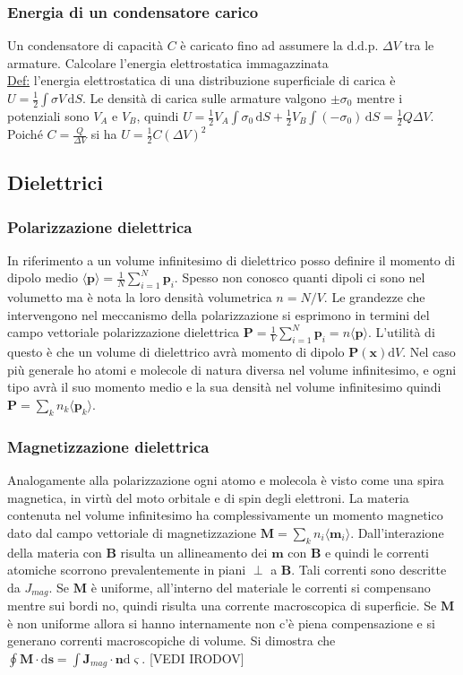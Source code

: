 \documentclass[11pt,a4paper]{article}
\newcommand{\de}{\mathrm d}
\begin{document}
\subsubsection{Energia di un condensatore carico}
Un condensatore di capacità $C$ è caricato fino ad assumere la d.d.p. $\Delta V$ tra le armature. Calcolare l'energia elettrostatica immagazzinata\\
\underline{Def:} l'energia elettrostatica di una distribuzione superficiale di carica è $U=\frac 12\int\sigma V\,\mathrm dS$. Le densità di carica sulle armature valgono $\pm\sigma_0$ mentre i potenziali sono $V_A$ e $V_B$, quindi $U=\frac 12 V_A\int\sigma_0\,\mathrm dS+\frac 12 V_B\int(-\sigma_0)\,\mathrm dS=\frac 12 Q\Delta V$. Poiché $C=\frac{Q}{\Delta V}$ si ha $U=\frac 12 C(\Delta V)^2$

\subsection{Dielettrici}
\subsubsection{Polarizzazione dielettrica}
In riferimento a un volume infinitesimo di dielettrico posso definire il momento di dipolo medio $\langle \mathbf p \rangle = \frac1N \sum_{i=1}^N \mathbf p_i$. Spesso non conosco quanti dipoli ci sono nel volumetto ma è nota la loro densità volumetrica $n = N/V$. Le grandezze che intervengono nel meccanismo della polarizzazione si esprimono in termini del campo vettoriale polarizzazione dielettrica $\mathbf P = \frac1V \sum_{i=1}^N \mathbf p_i = n \langle \mathbf p \rangle$. L'utilità di questo è che un volume di dielettrico avrà momento di dipolo $\mathbf P(\mathbf x) \de V$. Nel caso più generale ho atomi e molecole di natura diversa nel volume infinitesimo, e ogni tipo avrà il suo momento medio e la sua densità nel volume infinitesimo quindi $\mathbf P = \sum_k n_k \langle \mathbf p_k \rangle$.

\subsubsection{Magnetizzazione dielettrica}
Analogamente alla polarizzazione ogni atomo e molecola è visto come una spira magnetica, in virtù del moto orbitale e di spin degli elettroni. La materia contenuta nel volume infinitesimo ha complessivamente un momento magnetico dato dal campo vettoriale di magnetizzazione $\mathbf M = \sum_k n_i \langle \mathbf m_i \rangle$. Dall'interazione della materia con $\mathbf B$ risulta un allineamento dei $\mathbf m$ con $\mathbf B$ e quindi le correnti atomiche scorrono prevalentemente in piani $\perp$ a $\mathbf B$. Tali correnti sono descritte da $J_{mag}$. Se $\mathbf M$ è uniforme, all'interno del materiale le correnti si compensano mentre sui bordi no, quindi risulta una corrente macroscopica di superficie. Se $\mathbf M$ è non uniforme allora si hanno internamente non c'è piena compensazione e si generano correnti macroscopiche di volume. Si dimostra che $\oint \mathbf M \cdot \de\mathbf s = \int \mathbf J_{mag} \cdot \mathbf n \de\varsigma$. [VEDI IRODOV]
\end{document}
